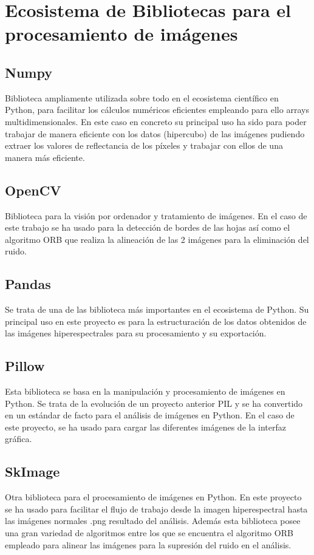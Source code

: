 \section{Ecosistema de Bibliotecas para el procesamiento de imágenes}

    \subsection{Numpy}
Biblioteca ampliamente utilizada sobre todo en el ecosistema científico en Python, para facilitar los cálculos numéricos eficientes empleando para ello arrays  multidimensionales. En este caso en concreto su principal uso ha sido para poder trabajar de manera eficiente con los datos (hipercubo) de las imágenes pudiendo extraer los valores de reflectancia de los píxeles y trabajar con ellos de una manera más eficiente\cite{Harris2020NumPy}.


\subsection{OpenCV}
Biblioteca para la visión por ordenador y tratamiento de imágenes. En el caso de este trabajo se ha usado para la detección de bordes de las hojas así como el algoritmo ORB que realiza la alineación de las 2 imágenes para la eliminación del ruido\cite{Bradski2000OpenCV}.

\subsection{Pandas}
Se trata de una de las biblioteca más importantes en el ecosistema de Python. Su principal uso en este proyecto es para la estructuración de los datos obtenidos de las imágenes hiperespectrales para su procesamiento y su exportación\cite{McKinney2010Pandas}.

\subsection{Pillow}
Esta biblioteca se basa en la manipulación y procesamiento de imágenes en Python. Se trata de la evolución de un proyecto anterior PIL y se ha convertido en un estándar de facto para el análisis de imágenes en Python. En el caso de este proyecto, se ha usado para cargar las diferentes imágenes de la interfaz gráfica\cite{Pillow}.

\subsection{SkImage}
Otra biblioteca para el procesamiento de imágenes en Python. En este proyecto se ha usado para facilitar el flujo de trabajo desde la imagen hiperespectral hasta las imágenes normales .png resultado del análisis.
Además esta biblioteca posee una gran variedad de algoritmos entre los que se encuentra el algoritmo ORB empleado para alinear las imágenes para la supresión del ruido en el análisis\cite{vanderWalt2014ScikitImage}.

